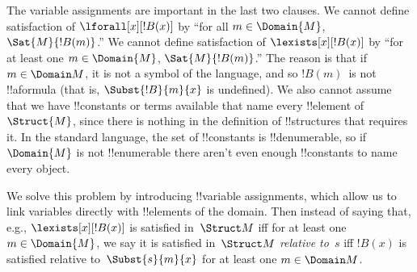 \begin{explain}
The variable assignments are important in the last
two clauses. We
cannot define satisfaction of $\lforall[x][!B(x)]$ by ``for all $m \in
\Domain{M}$, $\Sat{M}{!B(m)}$.'' We cannot define
satisfaction of $\lexists[x][!B(x)]$ by ``for at least one $m \in
\Domain{M}$, $\Sat{M}{!B(m)}$.'' The reason is that if $m \in
\Domain M$, it is not a symbol of the language, and so $!B(m)$~is not
!!a{formula} (that is, $\Subst{!B}{m}{x}$ is undefined).  We also
cannot assume that we have !!{constant}s or terms available that name
every !!{element} of~$\Struct{M}$, since there is nothing in the
definition of !!{structure}s that requires it.  In the standard
language, the set of !!{constant}s is !!{denumerable}, so if
$\Domain{M}$ is not !!{enumerable} there aren't even enough
!!{constant}s to name every object. 

We solve this problem by introducing !!{variable} assignments, which
allow us to link variables directly with !!{element}s of the domain.
Then instead of saying that, e.g.,
$\lexists[x][!B(x)]$ is satisfied
in~$\Struct M$ iff for at least one $m \in
\Domain{M}$, we say it
is satisfied in~$\Struct M$ \emph{relative to}~$s$ iff $!B(x)$ is
satisfied relative to~$\Subst{s}{m}{x}$ for at least
one $m \in \Domain M$.
\end{explain}


